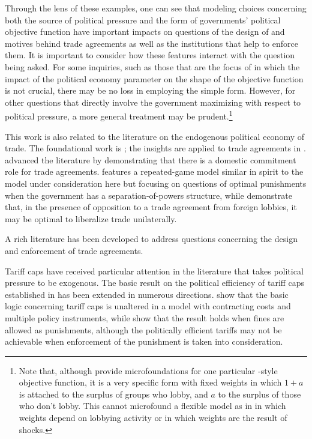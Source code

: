 Through the lens of these examples, one can see that modeling choices concerning both the source of political pressure and the form of governments' political objective function have important impacts on questions of the design of and motives behind trade agreements as well as the institutions that help to enforce them. It is important to consider how these features interact with the question being asked. For some inquiries, such as those that are the focus of \Textcite{ms2011, ms2012a} in which the impact of the political economy parameter on the shape of the objective function is not crucial, there may be no loss in employing the simple form. However, for other questions that directly involve the government maximizing with respect to political pressure, a more general treatment may be prudent.\footnote{Note that, although \Textcite{gh94} provide microfoundations for one particular \Textcite{baldwin}-style objective function, it is a very specific form with fixed weights in which $1+a$ is attached to the surplus of groups who lobby, and $a$ to the surplus of those who don't lobby. This cannot microfound a flexible model as in \Textcite{longvousden} in which weights depend on lobbying activity or in which weights are the result of shocks.}



This work is also related to the literature on the endogenous political economy of trade. The foundational work is \Textcite{gh94}; the insights are applied to trade agreements in \Textcite{gh95}. \Textcite{mrc2007} advanced the literature by demonstrating that there is a domestic commitment role for trade agreements. \Textcite{buzard2013a} features a repeated-game model similar in spirit to the model under consideration here but focusing on questions of optimal punishments when the government has a separation-of-powers structure, while \Textcite{coatesludema} demonstrate that, in the presence of opposition to a trade agreement from foreign lobbies, it may be optimal to liberalize trade unilaterally.

A rich literature has been developed to address questions concerning the design and enforcement of trade agreements.

Tariff caps have received particular attention in the literature that takes political pressure to be exogenous. The basic result on the political efficiency of tariff caps established in \Textcite{bs2005} has been extended in numerous directions. \Textcite{hms} show that the basic logic concerning tariff caps is unaltered in a model with contracting costs and multiple policy instruments, while \Textcite{ls} show that the result holds when fines are allowed as punishments, although the politically efficient tariffs may not be achievable when enforcement of the punishment is taken into consideration. 

